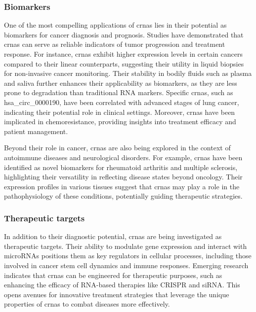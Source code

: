 \subsubsection{Biomarkers}
One of the most compelling applications of \gls{crna}s lies in their potential
as biomarkers for cancer diagnosis and prognosis.
Studies have demonstrated that \gls{crna}s can serve as reliable indicators of
tumor progression and treatment response.
For instance, \gls{crna}s exhibit higher expression levels in certain cancers
compared to their linear counterparts, suggesting their utility in liquid
biopsies for non-invasive cancer
monitoring\supercite{bao_prognostic_2020,ren_construction_2017}.
Their stability in bodily fluids such as plasma and saliva further enhances
their applicability as biomarkers, as they are less prone to degradation than
traditional RNA markers\supercite{bao_prognostic_2020,zhang_circular_2018}.
Specific \gls{crna}s, such as hsa\_circ\_0000190, have been correlated with
advanced stages of lung cancer, indicating their potential role in clinical
settings\supercite{luo_plasma_2020}.
Moreover, \gls{crna}s have been implicated in chemoresistance, providing
insights into treatment efficacy and patient
management\supercite{geng_function_2018,feng_functions_2019}.

Beyond their role in cancer, \gls{crna}s are also being explored in the context
of autoimmune diseases and neurological disorders.
For example, \gls{crna}s have been identified as novel biomarkers for
rheumatoid arthritis and multiple sclerosis, highlighting their versatility in
reflecting disease states beyond
oncology\supercite{ouyang_identification_2021,he_exosomal_2019}.
Their expression profiles in various tissues suggest that \gls{crna}s may play
a role in the pathophysiology of these conditions, potentially guiding
therapeutic strategies\supercite{mohammed_circular_2023}.

\subsubsection{Therapeutic targets}
In addition to their diagnostic potential, \gls{crna}s are being investigated
as therapeutic targets.
Their ability to modulate gene expression and interact with microRNAs positions
them as key regulators in cellular processes, including those involved in
cancer stem cell dynamics and immune responses\supercite{cheng_emerging_2023}.
Emerging research indicates that \gls{crna}s can be engineered for therapeutic
purposes, such as enhancing the efficacy of RNA-based therapies like CRISPR and
siRNA\supercite{wesselhoeft_engineering_2018}.
This opens avenues for innovative treatment strategies that leverage the unique
properties of \gls{crna}s to combat diseases more effectively.
